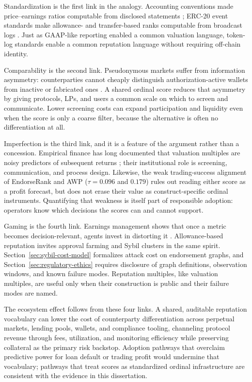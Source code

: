 Standardization is the first link in the analogy. Accounting conventions made price--earnings ratios computable from disclosed statements ; ERC-20 event standards make allowance- and transfer-based ranks computable from broadcast logs . Just as GAAP-like reporting enabled a common valuation language, token-log standards enable a common reputation language without requiring off-chain identity.

Comparability is the second link. Pseudonymous markets suffer from information asymmetry: counterparties cannot cheaply distinguish authorization-active wallets from inactive or fabricated ones . A shared ordinal score reduces that asymmetry by giving protocols, LPs, and users a common scale on which to screen and communicate. Lower screening costs can expand participation and liquidity even when the score is only a coarse filter, because the alternative is often no differentiation at all.

Imperfection is the third link, and it is a feature of the argument rather than a concession. Empirical finance has long documented that valuation multiples are noisy predictors of subsequent returns ; their institutional role is screening, communication, and process design. Likewise, the weak trading-success alignment of EndorseRank and AWP ($\tau=0.096$ and $0.179$) rules out reading either score as a profit forecast, but does not erase their value as construct-specific ordinal instruments. Quantifying that weakness is itself part of responsible adoption: operators know which decisions the scores can and cannot support.

Gaming is the fourth link. Earnings management shows that once a metric becomes decision-relevant, agents invest in distorting it . Allowance-based reputation invites approval farming and Sybil clusters in the same spirit. Section~\ref{sec:sybil-cost-model} formalizes attack cost on endorsement graphs, and Section~\ref{sec:regulatory-ethics} requires disclosure of graph definitions, observation windows, and known failure modes. Reputation multiples, like valuation multiples, are useful only when their construction is public and their failure modes are named.

The ecosystem effect follows from these four links. A shared, auditable reputation vocabulary can lower the cost of counterparty differentiation across perpetual markets, lending pools, wallets, and compliance tooling, channeling protocol revenue through fees, utilization, and monitoring efficiency while preserving collateral as the primary risk backstop. Adoption pathways that overclaim predictive power for loan default or trading profit would undermine that vocabulary; pathways that treat scores as standardized ordinal infrastructure are consistent with the evidence in this dissertation.

